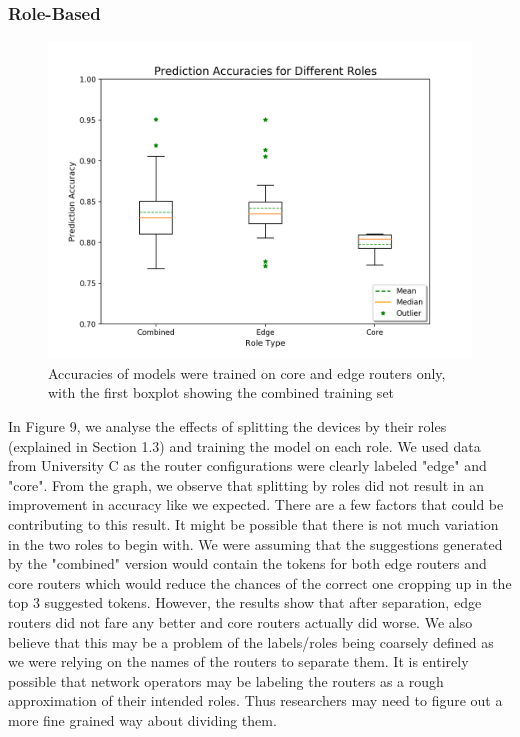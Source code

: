 \subsubsection{Role-Based}

\begin{figure}[H]
	\centering
	\includegraphics[width=\textwidth]{roles.png}
	\caption{Accuracies of models were trained on core and edge routers only, with the first boxplot showing the combined training set}
\end{figure}
In Figure 9, we analyse the effects of splitting the devices by their roles (explained in Section 1.3) and training the model on each role. We used data from University C as the router configurations were clearly labeled "edge" and "core". From the graph, we observe that splitting by roles did not result in an improvement in accuracy like we expected. There are a few factors that could be contributing to this result. It might be possible that there is not much variation in the two roles to begin with. We were assuming that the suggestions generated by the "combined" version would contain the tokens for both edge routers and core routers which would reduce the chances of the correct one cropping up in the top 3 suggested tokens. However, the results show that after separation, edge routers did not fare any better and core routers actually did worse. We also believe that this may be a problem of the labels/roles being coarsely defined as we were relying on the names of the routers to separate them. It is entirely possible that network operators may be labeling the routers as a rough approximation of their intended roles. Thus researchers may need to figure out a more fine grained way about dividing them.\\

